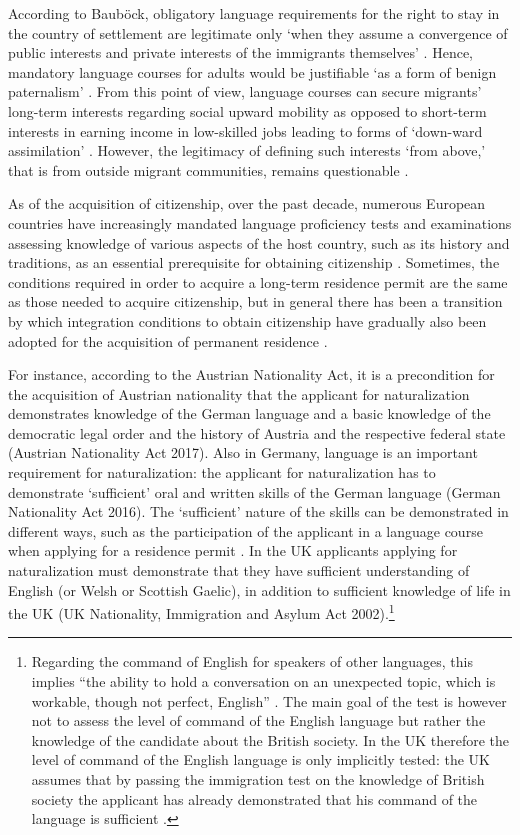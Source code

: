 \documentclass[output=paper,colorlinks,citecolor=brown]{langscibook}
\begin{document}
According to Bauböck, obligatory language requirements for the right to stay in the country of settlement are legitimate only `when they assume a convergence of public interests and private interests of the immigrants themselves' \citep{baubock2003}. Hence, mandatory language courses for adults would be justifiable `as a form of benign paternalism' \citep{baubock2003}. From this point of view, language courses can secure migrants' long-term interests regarding social upward mobility as opposed to short-term interests in earning income in low-skilled jobs leading to forms of `down-ward assimilation' \citep{marko_constantin2019}. However, the legitimacy of defining such interests `from above,' that is from outside migrant communities, remains questionable \citep{vertovec_wessendorf2005}.


As of the acquisition of citizenship, over the past decade, numerous European countries have increasingly mandated language proficiency tests and examinations assessing knowledge of various aspects of the host country, such as its history and traditions, as an essential prerequisite for obtaining citizenship \citep{acosta_arcarazo2011}. Sometimes, the conditions required in order to acquire a long-term residence permit are the same as those needed to acquire citizenship, but in general there has been a transition by which integration conditions to obtain citizenship have gradually also been adopted for the acquisition of permanent residence \citep{acosta_arcarazo2011}.

For instance, according to the Austrian Nationality Act, it is a precondition for the acquisition of Austrian nationality that the applicant for naturalization demonstrates knowledge of the German language and a basic knowledge of the democratic legal order and the history of Austria and the respective federal state (Austrian Nationality Act 2017). Also in Germany, language is an important requirement for naturalization: the applicant for naturalization has to demonstrate `sufficient' oral and written skills of the German language (German Nationality Act 2016). The `sufficient' nature of the skills can be demonstrated in different ways, such as the participation of the applicant in a language course when applying for a residence permit \citep{guild_groenendijk_carrera2009}. In the UK applicants applying for naturalization must demonstrate that they have sufficient understanding of English (or Welsh or Scottish Gaelic), in addition to sufficient knowledge of life in the UK (UK Nationality, Immigration and Asylum Act 2002).\footnote{Regarding the command of English for speakers of other languages, this implies ``the ability to hold a conversation on an unexpected topic, which is workable, though not perfect, English'' \citep{guild_groenendijk_carrera2009}. The main goal of the test is however not to assess the level of command of the English language but rather the knowledge of the candidate about the British society. In the UK therefore the level of command of the English language is only implicitly tested: the UK assumes that by passing the immigration test on the knowledge of British society the applicant has already demonstrated that his command of the language is sufficient \citep{guild_groenendijk_carrera2009}.}
\end{document}
